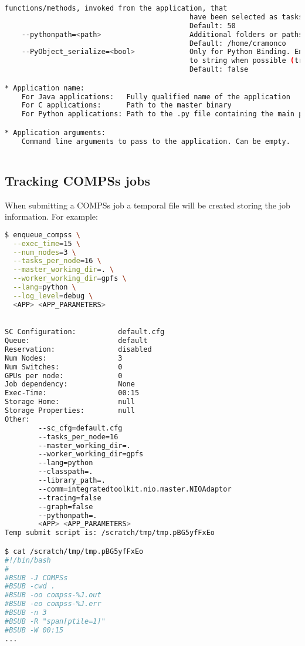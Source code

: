 \begin{lstlisting}[language=bash]
                                            functions/methods, invoked from the application, that 
                                            have been selected as tasks
                                            Default: 50
    --pythonpath=<path>                     Additional folders or paths to add to the PYTHONPATH
                                            Default: /home/cramonco
    --PyObject_serialize=<bool>             Only for Python Binding. Enable the object serialization
                                            to string when possible (true/false).
                                            Default: false

* Application name:
    For Java applications:   Fully qualified name of the application
    For C applications:      Path to the master binary
    For Python applications: Path to the .py file containing the main program

* Application arguments:
    Command line arguments to pass to the application. Can be empty.
  
\end{lstlisting}

\subsection{Tracking COMPSs jobs}
When submitting a COMPSs job a temporal file will be created storing the job information. For example:
\begin{lstlisting}[language=bash]
$ enqueue_compss \
  --exec_time=15 \
  --num_nodes=3 \
  --tasks_per_node=16 \
  --master_working_dir=. \
  --worker_working_dir=gpfs \
  --lang=python \
  --log_level=debug \
  <APP> <APP_PARAMETERS>

  
SC Configuration:          default.cfg
Queue:                     default
Reservation:               disabled
Num Nodes:                 3
Num Switches:              0
GPUs per node:             0
Job dependency:            None
Exec-Time:                 00:15
Storage Home:              null
Storage Properties:        null
Other:                     
        --sc_cfg=default.cfg
        --tasks_per_node=16
        --master_working_dir=.
        --worker_working_dir=gpfs
        --lang=python
        --classpath=.
        --library_path=.
        --comm=integratedtoolkit.nio.master.NIOAdaptor
        --tracing=false
        --graph=false
        --pythonpath=.
        <APP> <APP_PARAMETERS>
Temp submit script is: /scratch/tmp/tmp.pBG5yfFxEo

$ cat /scratch/tmp/tmp.pBG5yfFxEo
#!/bin/bash
#
#BSUB -J COMPSs
#BSUB -cwd . 
#BSUB -oo compss-%J.out
#BSUB -eo compss-%J.err
#BSUB -n 3
#BSUB -R "span[ptile=1]"
#BSUB -W 00:15 
...
\end{lstlisting}

